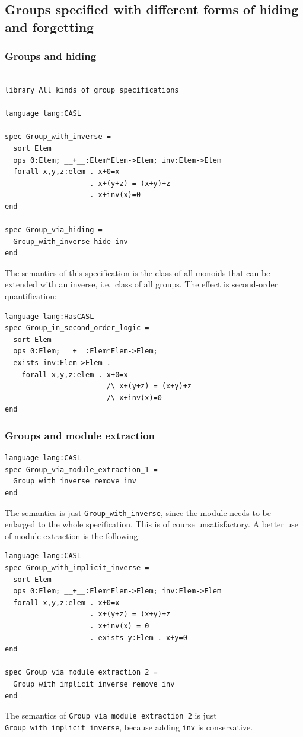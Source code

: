\documentclass[10pt,fleqn,final]{scrreprt}
\newcommand*{\syntax}[1]{\texttt{#1}}
\newcommand{\ssclause}[1]{\subsection{#1}}
\newcommand{\sssclause}[1]{\subsubsection{#1}}
\begin{document}
\ssclause{Groups specified with different forms of hiding and forgetting}

\sssclause{Groups and hiding}
\begin{lstlisting}[basicstyle=\ttfamily,language=dolText,alsolanguage=CASL,escapechar=@,mathescape]
%prefix( lang: <http://purl.net/DOL/languages/> )%

library All_kinds_of_group_specifications

language lang:CASL

spec Group_with_inverse =
  sort Elem
  ops 0:Elem; __+__:Elem*Elem->Elem; inv:Elem->Elem
  forall x,y,z:elem . x+0=x
                    . x+(y+z) = (x+y)+z
                    . x+inv(x)=0
end

spec Group_via_hiding =
  Group_with_inverse hide inv
end
\end{lstlisting}

The semantics of this specification is the class of all monoids that
can be extended with an inverse, i.e.\ class of all groups. The effect
is second-order quantification:

\begin{lstlisting}[basicstyle=\ttfamily,language=dolText,alsolanguage=CASL,escapechar=@,mathescape]
language lang:HasCASL
spec Group_in_second_order_logic =
  sort Elem
  ops 0:Elem; __+__:Elem*Elem->Elem; 
  exists inv:Elem->Elem .
    forall x,y,z:elem . x+0=x
                        /\ x+(y+z) = (x+y)+z
                        /\ x+inv(x)=0
end
\end{lstlisting}

\sssclause{Groups and module extraction}

\begin{lstlisting}[basicstyle=\ttfamily,language=dolText,alsolanguage=CASL,escapechar=@,mathescape]
language lang:CASL
spec Group_via_module_extraction_1 =
  Group_with_inverse remove inv
end
\end{lstlisting}
The semantics is just \syntax{Group\_with\_inverse},
since the module needs to be enlarged to the whole specification.
This is of course unsatisfactory. A better use of module extraction
is the following:

\begin{lstlisting}[basicstyle=\ttfamily,language=dolText,alsolanguage=CASL,escapechar=@,mathescape]
language lang:CASL
spec Group_with_implicit_inverse =
  sort Elem
  ops 0:Elem; __+__:Elem*Elem->Elem; inv:Elem->Elem
  forall x,y,z:elem . x+0=x
                    . x+(y+z) = (x+y)+z
                    . x+inv(x) = 0
                    . exists y:Elem . x+y=0
end

spec Group_via_module_extraction_2 =
  Group_with_implicit_inverse remove inv
end
\end{lstlisting}
The semantics of \syntax{Group\_via\_module\_extraction\_2} is just
\syntax{Group\_with\_implicit\_inverse}, because adding \texttt{inv}
is conservative.
\medskip
\end{document}

